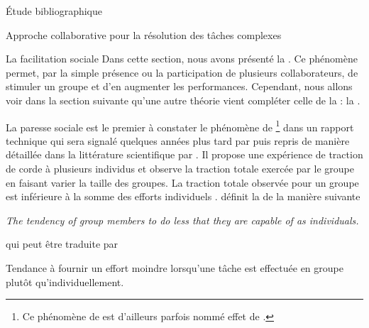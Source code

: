 \documentclass[myfrancais,ngerman,english,french]{mythesis}
\begin{document}
\begin{mychapter}{Étude bibliographique}
\begin{mysection}{Approche collaborative pour la résolution des tâches complexes}
\begin{mysubsection}{La facilitation sociale}
				Dans cette section, nous avons présenté la .
				Ce phénomène permet, par la simple présence ou la participation de plusieurs collaborateurs, de stimuler un groupe et d'en augmenter les performances.
				Cependant, nous allons voir dans la section suivante qu'une autre théorie vient compléter celle de la  : la .
			\end{mysubsection}
			\begin{mysubsection}{La paresse sociale}
				 est le premier à constater le phénomène de \footnote{Ce phénomène de  est d'ailleurs parfois nommé \og effet de  \fg.} dans un rapport technique qui sera signalé quelques années plus tard par  puis repris de manière détaillée dans la littérature scientifique par .
				Il propose une expérience de traction de corde à plusieurs individus et observe la traction totale exercée par le groupe en faisant varier la taille des groupes.
				La traction totale observée pour un groupe est inférieure à la somme des efforts individuels .
				 définit la  de la manière suivante
				\begin{myquote}[english]
					\it The tendency of group members to do less that they are capable of as individuals.
				\end{myquote}
				qui peut être traduite par
				\begin{myquote}[french]
					Tendance à fournir un effort moindre lorsqu'une tâche est effectuée en groupe plutôt qu'individuellement.
				\end{myquote}


\end{mysubsection}
\end{mysection}
\end{mychapter}
\end{document}
